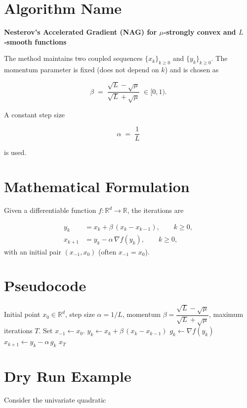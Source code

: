 \documentclass{article}
\begin{document}
\section*{Algorithm Name}
\textbf{Nesterov’s Accelerated Gradient (NAG) for $\mu$‑strongly convex and $L$‑smooth functions}  

The method maintains two coupled sequences $\{x_k\}_{k\ge 0}$ and $\{y_k\}_{k\ge 0}$.
The momentum parameter is fixed (does not depend on $k$) and is chosen as  

\[
\beta \;=\; \frac{\sqrt{L}-\sqrt{\mu}}{\sqrt{L}+\sqrt{\mu}}\;\in[0,1).
\]

A constant step size  

\[
\alpha \;=\; \frac{1}{L}
\]

is used.  

\section*{Mathematical Formulation}
Given a differentiable function $f:\mathbb{R}^d\to\mathbb{R}$, the iterations are  

\[
\boxed{
\begin{aligned}
y_k &= x_k + \beta\,(x_k - x_{k-1}),\qquad k\ge 0,\\[4pt]
x_{k+1} &= y_k - \alpha \,\nabla f(y_k),\qquad k\ge 0,
\end{aligned}}
\]
with an initial pair $(x_{-1},x_0)$ (often $x_{-1}=x_0$).  

\section*{Pseudocode}
\begin{algorithm}[H]
\caption{NAG for strongly convex smooth $f$}
\begin{algorithmic}[1]
\REQUIRE Initial point $x_0\in\mathbb{R}^d$, step size $\alpha=1/L$, momentum $\beta=\dfrac{\sqrt{L}-\sqrt{\mu}}{\sqrt{L}+\sqrt{\mu}}$, maximum iterations $T$.
\STATE Set $x_{-1}\gets x_0$.
    \STATE $y_k \gets x_k + \beta\,(x_k - x_{k-1})$ \hfill{}
    \STATE $g_k \gets \nabla f(y_k)$ \hfill{}
    \STATE $x_{k+1} \gets y_k - \alpha\, g_k$ \hfill{}
\ENDFOR
\RETURN $x_T$
\end{algorithmic}
\end{algorithm}

\section*{Dry Run Example}
Consider the univariate quadratic  
\end{document}
